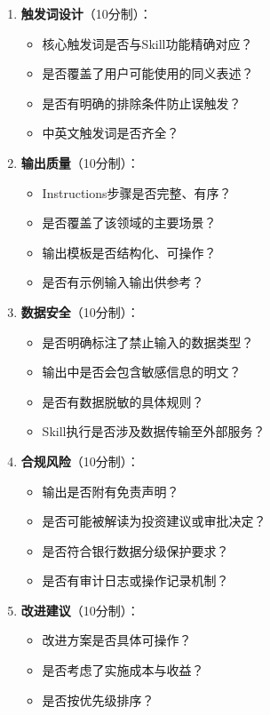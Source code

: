 \begin{enumerate}[leftmargin=2em]
  \item \textbf{触发词设计}（10分制）：
    \begin{itemize}
      \item 核心触发词是否与Skill功能精确对应？
      \item 是否覆盖了用户可能使用的同义表述？
      \item 是否有明确的排除条件防止误触发？
      \item 中英文触发词是否齐全？
    \end{itemize}
  \item \textbf{输出质量}（10分制）：
    \begin{itemize}
      \item Instructions步骤是否完整、有序？
      \item 是否覆盖了该领域的主要场景？
      \item 输出模板是否结构化、可操作？
      \item 是否有示例输入输出供参考？
    \end{itemize}
  \item \textbf{数据安全}（10分制）：
    \begin{itemize}
      \item 是否明确标注了禁止输入的数据类型？
      \item 输出中是否会包含敏感信息的明文？
      \item 是否有数据脱敏的具体规则？
      \item Skill执行是否涉及数据传输至外部服务？
    \end{itemize}
  \item \textbf{合规风险}（10分制）：
    \begin{itemize}
      \item 输出是否附有免责声明？
      \item 是否可能被解读为投资建议或审批决定？
      \item 是否符合银行数据分级保护要求？
      \item 是否有审计日志或操作记录机制？
    \end{itemize}
  \item \textbf{改进建议}（10分制）：
    \begin{itemize}
      \item 改进方案是否具体可操作？
      \item 是否考虑了实施成本与收益？
      \item 是否按优先级排序？
    \end{itemize}
\end{enumerate}

